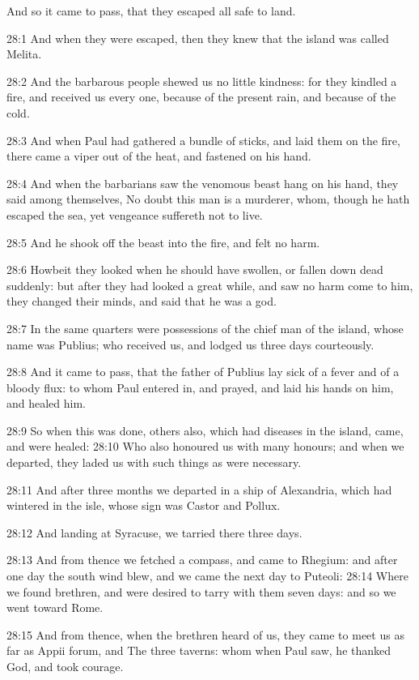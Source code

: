 And so it came to pass, that they escaped all safe to land.

28:1 And when they were escaped, then they knew that the island was
called Melita.

28:2 And the barbarous people shewed us no little kindness: for they
kindled a fire, and received us every one, because of the present
rain, and because of the cold.

28:3 And when Paul had gathered a bundle of sticks, and laid them on
the fire, there came a viper out of the heat, and fastened on his
hand.

28:4 And when the barbarians saw the venomous beast hang on his hand,
they said among themselves, No doubt this man is a murderer, whom,
though he hath escaped the sea, yet vengeance suffereth not to live.

28:5 And he shook off the beast into the fire, and felt no harm.

28:6 Howbeit they looked when he should have swollen, or fallen down
dead suddenly: but after they had looked a great while, and saw no
harm come to him, they changed their minds, and said that he was a
god.

28:7 In the same quarters were possessions of the chief man of the
island, whose name was Publius; who received us, and lodged us three
days courteously.

28:8 And it came to pass, that the father of Publius lay sick of a
fever and of a bloody flux: to whom Paul entered in, and prayed, and
laid his hands on him, and healed him.

28:9 So when this was done, others also, which had diseases in the
island, came, and were healed: 28:10 Who also honoured us with many
honours; and when we departed, they laded us with such things as were
necessary.

28:11 And after three months we departed in a ship of Alexandria,
which had wintered in the isle, whose sign was Castor and Pollux.

28:12 And landing at Syracuse, we tarried there three days.

28:13 And from thence we fetched a compass, and came to Rhegium: and
after one day the south wind blew, and we came the next day to
Puteoli: 28:14 Where we found brethren, and were desired to tarry with
them seven days: and so we went toward Rome.

28:15 And from thence, when the brethren heard of us, they came to
meet us as far as Appii forum, and The three taverns: whom when Paul
saw, he thanked God, and took courage.

